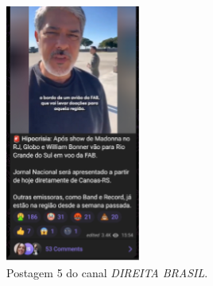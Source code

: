 \documentclass[portuguese]{textolivre}
\begin{document}
\begin{figure}[h!]
\begin{minipage}[t]{0.29\textwidth}
        \includegraphics[width=\linewidth]{Imagens/Fig32.png}
        \caption{Postagem 5 do canal \emph{DIREITA BRASIL}.}
        \label{fig-32}
    \end{minipage}
    
\end{figure}
\end{document}
